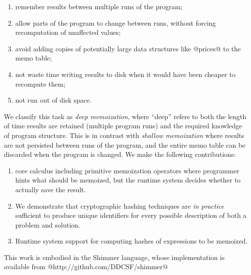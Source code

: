 \begin{enumerate}
\item remember results between multiple runs of the program;
\item allow parts of the program to change between runs, without forcing recomputation of unaffected values;
\item avoid adding copies of potentially large data structures like @prices@ to the memo table;
\item not waste time writing results to disk when it would have been cheaper to recompute them;
\item not run out of disk space.
\end{enumerate}

We classify this task as \emph{deep memoization}, where ``deep'' refers to both the length of time results are retained (multiple program runs) and the required knowledge of program structure. This is in contrast with \emph{shallow memoization} where results are not persisted between runs of the program, and the entire memo table can be discarded when the program is changed. We make the following contributions:

\begin{enumerate}
\item core calculus including primitive memoization operators where programmer hints what should be memoized, but the runtime system decides whether to actually save the result.

\item We demonstrate that cryptographic hashing techniques are \emph{in practice} sufficient to produce unique identifiers for every possible description of both a problem and solution.

\item Runtime system support for computing hashes of expressions to be memoized.

\end{enumerate}

This work is embodied in the Shimmer language, whose implementation is available from @http://github.com/DDCSF/shimmer@
